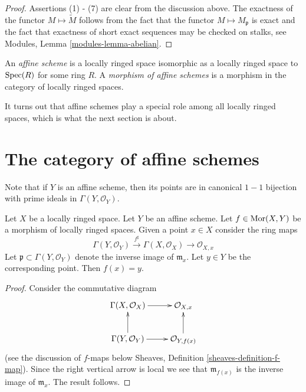 \begin{proof}
Assertions (1) - (7) are clear from the discussion above.
The exactness of the functor $M \mapsto \widetilde M$
follows from the fact that the functor $M \mapsto M_{\mathfrak p}$
is exact and the fact that exactness of short exact sequences
may be checked on stalks, see
Modules, Lemma \ref{modules-lemma-abelian}.
\end{proof}

\begin{definition}
\label{definition-affine-scheme}
An {\it affine scheme} is a locally ringed space isomorphic
as a locally ringed space to $\mathop{\mathrm{Spec}}(R)$ for some ring $R$.
A {\it morphism of affine schemes} is a morphism in the category
of locally ringed spaces.
\end{definition}

\noindent
It turns out that affine schemes play a special role
among all locally ringed spaces, which is what the next
section is about.


















\section{The category of affine schemes}
\label{section-category-affine-schemes}

\noindent
Note that if $Y$ is an affine scheme, then its
points are in canonical $1-1$ bijection with
prime ideals in $\Gamma(Y, \mathcal{O}_Y)$.

\begin{lemma}
\label{lemma-morphism-into-affine-where-point-goes}
Let $X$ be a locally ringed space.
Let $Y$ be an affine scheme.
Let $f \in \mathop{\mathrm{Mor}}\nolimits(X, Y)$ be a morphism
of locally ringed spaces. Given a point $x \in X$
consider the ring maps
$$
\Gamma(Y, \mathcal{O}_Y) \xrightarrow{f^\sharp}
\Gamma(X, \mathcal{O}_X) \to \mathcal{O}_{X, x}
$$
Let $\mathfrak p \subset \Gamma(Y, \mathcal{O}_Y)$ denote
the inverse image of $\mathfrak m_x$. Let $y \in Y$ be the
corresponding point. Then $f(x) = y$.
\end{lemma}

\begin{proof}
Consider the commutative diagram
$$
\xymatrix{
\Gamma(X, \mathcal{O}_X) \ar[r] &
\mathcal{O}_{X, x} \\
\Gamma(Y, \mathcal{O}_Y) \ar[r] \ar[u] &
\mathcal{O}_{Y, f(x)} \ar[u]
}
$$
(see the discussion of $f$-maps below
Sheaves, Definition \ref{sheaves-definition-f-map}).
Since the right vertical arrow is local
we see that $\mathfrak m_{f(x)}$ is the
inverse image of $\mathfrak m_x$. The result
follows.
\end{proof}

